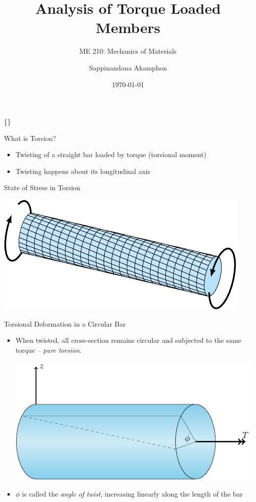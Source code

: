 \documentclass[10pt, svgnames]{beamer}
\author{Sappinandana Akamphon}
\date{\today}
\title{Analysis of Torque Loaded Members}
\subtitle{ME 210: Mechanics of Materials}
\institute{Department of Mechanical Engineering, TSE}
\date{}
\begin{document}
\begin{frame}[label={sec:orga9b065d}]{\{\}}
\maketitle
\end{frame}

\begin{frame}[label={sec:orgf5fe522}]{What is Torsion?}
\begin{itemize}
\item Twisting of a straight bar loaded by torque (torsional moment)

\item Twisting happens about its longitudinal axis
\end{itemize}
\end{frame}

\begin{frame}[label={sec:org72d4dd1}]{State of Stress in Torsion}
\begin{center}
\includegraphics[width=.9\linewidth]{pictures/state-of-torsion-stress.pdf}
\end{center}
\end{frame}

\begin{frame}[label={sec:org84860ee}]{Torsional Deformation in a Circular Bar}
\begin{itemize}
\item When twisted, all cross-section remains circular and subjected to the same torque -- \emph{pure torsion}.

\begin{center}
\includegraphics[width=.9\linewidth]{pictures/twisted-bar.pdf}
\end{center}

\item \(\phi\) is called the \emph{angle of twist}, increasing linearly along the length of the bar
\end{itemize}
\end{frame}
\end{document}

